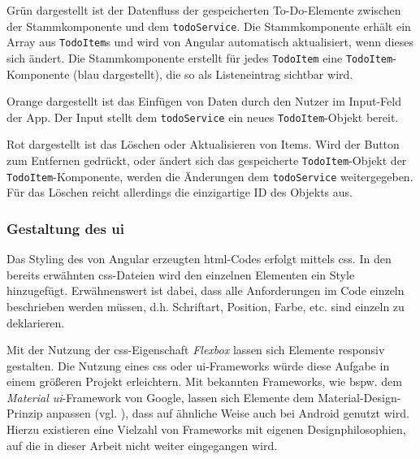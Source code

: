 Grün dargestellt ist der Datenfluss der gespeicherten To-Do-Elemente zwischen der Stammkomponente und dem \texttt{todoService}. Die Stammkomponente erhält ein Array aus \texttt{TodoItem}s und wird von Angular automatisch aktualisiert, wenn dieses sich ändert.
Die Stammkomponente erstellt für jedes \texttt{TodoItem} eine \texttt{TodoItem}-Komponente (blau dargestellt), die so als Listeneintrag sichtbar wird.

Orange dargestellt ist das Einfügen von Daten durch den Nutzer im Input-Feld der App. Der Input stellt dem \texttt{todoService} ein neues \texttt{TodoItem}-Objekt bereit.

Rot dargestellt ist das Löschen oder Aktualisieren von Items. Wird der Button zum Entfernen gedrückt, oder ändert sich das gespeicherte \texttt{TodoItem}-Objekt der \texttt{TodoItem}-Komponente, werden die Änderungen dem \texttt{todoService} weitergegeben.
Für das Löschen reicht allerdings die einzigartige ID des Objekts aus.

\subsubsection{Gestaltung des \acl{ui}}
Das Styling des von Angular erzeugten \ac{html}-Codes erfolgt mittels \ac{css}. In den bereits erwähnten \ac{css}-Dateien wird den einzelnen Elementen ein Style hinzugefügt.
Erwähnenswert ist dabei, dass alle Anforderungen im Code einzeln beschrieben werden müssen, d.h. Schriftart, Position, Farbe, etc. sind einzeln zu deklarieren.

Mit der Nutzung der \ac{css}-Eigenschaft \textit{Flexbox} lassen sich Elemente responsiv gestalten. Die Nutzung eines \ac{css} oder \ac{ui}-Frameworks würde diese Aufgabe in einem größeren Projekt erleichtern. Mit bekannten Frameworks, wie bspw. dem \textit{Material \ac{ui}}-Framework von Google, lassen sich Elemente dem Material-Design-Prinzip anpassen (vgl. \cite{MaterialUI}), dass auf ähnliche Weise auch bei Android genutzt wird. Hierzu existieren eine Vielzahl von Frameworks mit eigenen Designphilosophien, auf die in dieser Arbeit nicht weiter eingegangen wird.

